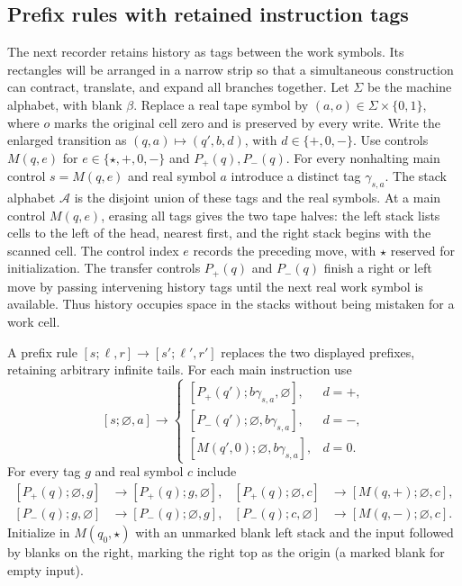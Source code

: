 \subsection{Prefix rules with retained instruction tags}
\label{sv:tags}
The next recorder retains history as tags between the work symbols.
Its rectangles will be arranged in a narrow strip so that a simultaneous
construction can contract, translate, and expand all branches together.
Let $\Sigma$ be the machine alphabet, with blank $\beta$.
Replace a real tape symbol by $(a,o)\in\Sigma\times\{0,1\}$,
where $o$ marks the original cell zero and is preserved by every write.
Write the enlarged transition as $(q,a)\mapsto(q',b,d)$, with
$d\in\{+,0,-\}$.  Use controls $M(q,e)$ for
$e\in\{\star,+,0,-\}$ and $P_+(q),P_-(q)$.
For every nonhalting main control $s=M(q,e)$ and real symbol $a$
introduce a distinct tag $\gamma_{s,a}$.  The stack alphabet
$\mathcal A$ is the disjoint union of these tags and the real symbols.
At a main control $M(q,e)$, erasing all tags gives the two tape halves:
the left stack lists cells to the left of the head, nearest first,
and the right stack begins with the scanned cell. The control index $e$ records
the preceding move, with $\star$ reserved for initialization.
The transfer controls $P_+(q)$ and $P_-(q)$ finish a right or left
move by passing intervening history tags until the next real work
symbol is available. Thus history occupies space in the stacks without
being mistaken for a work cell.

A prefix rule $[s;\ell,r]\to[s';\ell',r']$ replaces the two
displayed prefixes, retaining arbitrary infinite tails.  For each main
instruction use
\begin{equation}\label{sv:tag-primary}
 [s;\varnothing,a]\longrightarrow
 \begin{cases}
 [P_+(q');b\gamma_{s,a},\varnothing],&d=+,\\
 [P_-(q');\varnothing,b\gamma_{s,a}],&d=-,\\
 [M(q',0);\varnothing,b\gamma_{s,a}],&d=0.
 \end{cases}
\end{equation}
For every tag $g$ and real symbol $c$ include
\begin{equation}\label{sv:tag-transfer}
\begin{aligned}
{}[P_+(q);\varnothing,g]&\to[P_+(q);g,\varnothing],&
[P_+(q);\varnothing,c]&\to[M(q,+);\varnothing,c],\\
[P_-(q);g,\varnothing]&\to[P_-(q);\varnothing,g],&
[P_-(q);c,\varnothing]&\to[M(q,-);\varnothing,c].
\end{aligned}
\end{equation}
Initialize in $M(q_0,\star)$ with an unmarked blank left stack and
the input followed by blanks on the right, marking the right top as
the origin (a marked blank for empty input).

